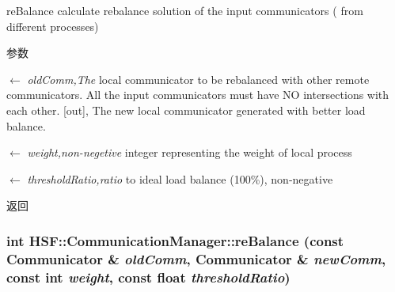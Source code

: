 reBalance calculate rebalance solution of the input communicators ( from different processes) 
\begin{DoxyParams}{参数}
\item[\mbox{$\leftarrow$} {\em oldComm,The}]local communicator to be rebalanced with other remote communicators. All the input communicators must have NO intersections with each other. \mbox{[}out\mbox{]}, The new local communicator generated with better load balance. \item[\mbox{$\leftarrow$} {\em weight,non-\/negetive}]integer representing the weight of local process \item[\mbox{$\leftarrow$} {\em thresholdRatio,ratio}]to ideal load balance (100\%), non-\/negative \end{DoxyParams}
\begin{DoxyReturn}{返回}

\end{DoxyReturn}
\hypertarget{classHSF_1_1CommunicationManager_a6639239769aede35bcaa47b5b6aeb2b1}{
\subsubsection[{reBalance}]{\setlength{\rightskip}{0pt plus 5cm}int HSF::CommunicationManager::reBalance (const {\bf Communicator} \& {\em oldComm}, \/  {\bf Communicator} \& {\em newComm}, \/  const int {\em weight}, \/  const float {\em thresholdRatio})}}
\label{classHSF_1_1CommunicationManager_a6639239769aede35bcaa47b5b6aeb2b1}


